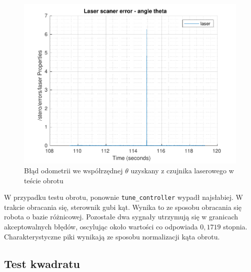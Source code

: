 \documentclass{mwrep}
\begin{document}
\begin{figure}[H]
	\centering
	\includegraphics[scale=0.85]{./figures/pro1/circle_tune/circle_tune_laser_theta.pdf}
	\caption{Błąd odometrii we współrzędnej $\theta$ uzyskany z czujnika laserowego w teście obrotu}
\end{figure}

W przypadku testu obrotu, ponownie \texttt{tune\_{controller}} wypadł najsłabiej. W trakcie obracania się,
sterownik gubi kąt. Wynika to ze sposobu obracania się robota o bazie różnicowej. Pozostałe dwa sygnały utrzymują
się w granicach akceptowalnych błędów, oscylując około wartości co odpowiada $0,1719$ stopnia. Charakterystyczne piki
wynikają ze sposobu normalizacji kąta obrotu.
\newpage

\subsection{Test kwadratu}
\label{pro1_figures_square}
\end{document}
